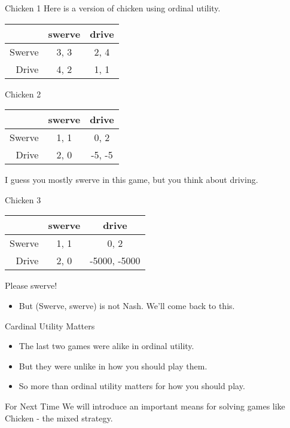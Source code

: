 \documentclass[
  ignorenonframetext,
]{beamer}
\providecommand{\tightlist}{%
  \setlength{\itemsep}{0pt}\setlength{\parskip}{0pt}}
\begin{document}
\begin{frame}{Chicken 1}
\protect\hypertarget{chicken-1}{}
Here is a version of chicken using ordinal utility.

\begin{table}[!h]
\centering
\begin{tabular}[t]{>{}r|cc}
\toprule
 & swerve & drive\\
\midrule
Swerve & 3, 3 & 2, 4\\
Drive & 4, 2 & 1, 1\\
\bottomrule
\end{tabular}
\end{table}
\end{frame}

\begin{frame}{Chicken 2}
\protect\hypertarget{chicken-2}{}
\begin{table}[!h]
\centering
\begin{tabular}[t]{>{}r|cc}
\toprule
 & swerve & drive\\
\midrule
Swerve & 1, 1 & 0, 2\\
Drive & 2, 0 & -5, -5\\
\bottomrule
\end{tabular}
\end{table}

I guess you mostly swerve in this game, but you think about driving.
\end{frame}

\begin{frame}{Chicken 3}
\protect\hypertarget{chicken-3}{}
\begin{table}[!h]
\centering
\begin{tabular}[t]{>{}r|cc}
\toprule
 & swerve & drive\\
\midrule
Swerve & 1, 1 & 0, 2\\
Drive & 2, 0 & -5000, -5000\\
\bottomrule
\end{tabular}
\end{table}

Please swerve! \pause

\begin{itemize}
\tightlist
\item
  But (Swerve, swerve) is not Nash. We'll come back to this.
\end{itemize}
\end{frame}

\begin{frame}{Cardinal Utility Matters}
\protect\hypertarget{cardinal-utility-matters}{}
\begin{itemize}
\tightlist
\item
  The last two games were alike in ordinal utility.
\item
  But they were unlike in how you should play them.
\item
  So more than ordinal utility matters for how you should play.
\end{itemize}
\end{frame}

\begin{frame}{For Next Time}
\protect\hypertarget{for-next-time}{}
We will introduce an important means for solving games like Chicken -
the mixed strategy.
\end{frame}
\end{document}

